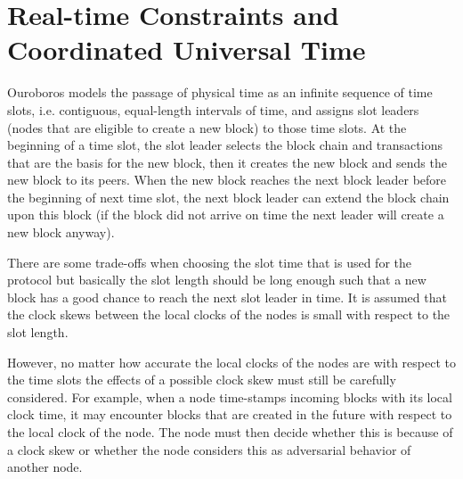 \section{Real-time Constraints and Coordinated Universal Time}
Ouroboros models the passage of physical time as an infinite sequence of time
slots, i.e. contiguous, equal-length intervals of time, and assigns slot
leaders (nodes that are eligible to create a new block) to those time slots.
At the beginning of a time slot, the slot leader selects the block chain and
transactions that are the basis for the new block, then it creates the new
block and sends the new block to its peers.  When the new block reaches the
next block leader before the beginning of next time slot, the next block leader
can extend the block chain upon this block (if the block did not arrive on time
the next leader will create a new block anyway).

There are some trade-offs when choosing the slot time that is used for the
protocol but basically the slot length should be long enough such that a new
block has a good chance to reach the next slot leader in time.  It is assumed
that the clock skews between the local clocks of the nodes is small with
respect to the slot length.

However, no matter how accurate the local clocks of the nodes are with respect
to the time slots the effects of a possible clock skew must still be carefully
considered.  For example, when a node time-stamps incoming blocks with its
local clock time, it may encounter blocks that are created in the future with
respect to the local clock of the node.  The node must then decide whether this
is because of a clock skew or whether the node considers this as adversarial
behavior of another node.
